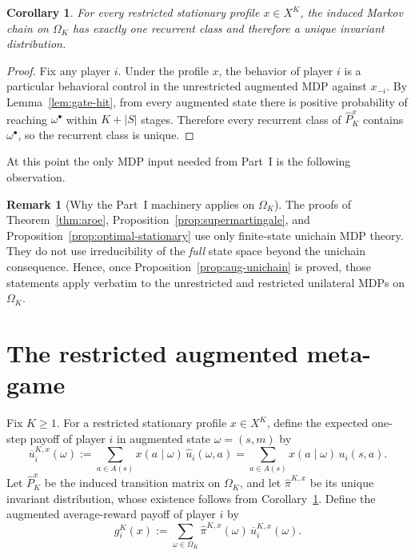 \documentclass[11pt]{article}
\newtheorem{corollary}[theorem]{Corollary}
\theoremstyle{definition}
\newtheorem{remark}[theorem]{Remark}
\newcommand{\1}{\mathbf{1}}
\begin{document}
\begin{corollary}\label{cor:aug-profile-unichain}
For every restricted stationary profile $x\in X^K$, the induced Markov chain on $\Omega_K$ has exactly one recurrent class and therefore a unique invariant distribution.
\end{corollary}

\begin{proof}
Fix any player $i$. Under the profile $x$, the behavior of player $i$ is a particular behavioral control in the unrestricted augmented MDP against $x_{-i}$. By Lemma~\ref{lem:gate-hit}, from every augmented state there is positive probability of reaching $\omega^\bullet$ within $K+|S|$ stages. Therefore every recurrent class of $\widehat P_K^x$ contains $\omega^\bullet$, so the recurrent class is unique.
\end{proof}

At this point the only MDP input needed from Part~I is the following observation.

\begin{remark}[Why the Part~I machinery applies on $\Omega_K$]\label{rem:verbatim}
The proofs of Theorem~\ref{thm:aroe}, Proposition~\ref{prop:supermartingale}, and Proposition~\ref{prop:optimal-stationary} use only finite-state unichain MDP theory. They do not use irreducibility of the \emph{full} state space beyond the unichain consequence. Hence, once Proposition~\ref{prop:aug-unichain} is proved, those statements apply verbatim to the unrestricted and restricted unilateral MDPs on $\Omega_K$.
\end{remark}

\section{The restricted augmented meta-game}\label{sec:aug-metagame}

Fix $K\ge1$. For a restricted stationary profile $x\in X^K$, define the expected one-step payoff of player $i$ in augmented state $\omega=(s,m)$ by
\[
\overline u_i^{K,x}(\omega):=\sum_{a\in A(s)}x(a\mid \omega)\,\widehat u_i(\omega,a)
=
\sum_{a\in A(s)}x(a\mid \omega)\,u_i(s,a).
\]
Let $\widehat P_K^x$ be the induced transition matrix on $\Omega_K$, and let $\widehat\pi^{K,x}$ be its unique invariant distribution, whose existence follows from Corollary~\ref{cor:aug-profile-unichain}. Define the augmented average-reward payoff of player $i$ by
\begin{equation}\label{eq:aug-payoff}
g_i^K(x):=\sum_{\omega\in\Omega_K}\widehat\pi^{K,x}(\omega)\,\overline u_i^{K,x}(\omega).
\end{equation}
\end{document}
